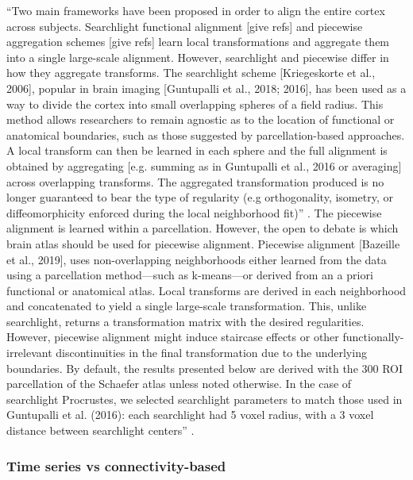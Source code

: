``Two main frameworks have been proposed in order to align the entire cortex
across subjects.
%
Searchlight functional alignment [give refs] and piecewise aggregation schemes
[give refs] learn local transformations and aggregate them into a single
large-scale alignment.
%
However, searchlight and piecewise differ in how they aggregate transforms.
%
The searchlight scheme [Kriegeskorte et al., 2006], popular in brain imaging
[Guntupalli et al., 2018; 2016], has been used as a way to divide the cortex
into small overlapping spheres of a field radius.
%
This method allows researchers to remain agnostic as to the location of
functional or anatomical boundaries, such as those suggested by
parcellation-based approaches.
%
A local transform can then be learned in each sphere and the full alignment is
obtained by aggregating [e.g. summing as in Guntupalli et al., 2016 or
averaging] across overlapping transforms.
%
The aggregated transformation produced is no longer guaranteed to bear the type
of regularity (e.g orthogonality, isometry, or diffeomorphicity enforced during
the local neighborhood fit)'' \citep{bazeille2021empirical}.
%
The piecewise alignment is learned within a parcellation.
%
However, the open to debate is which brain atlas should be used for piecewise
alignment.
%
Piecewise alignment [Bazeille et al., 2019], uses non-overlapping
neighborhoods either learned from the data using a parcellation method—such as
k-means—or derived from an a priori functional or anatomical atlas.
%
Local transforms are derived in each neighborhood and concatenated to yield a
single large-scale transformation.
%
This, unlike searchlight, returns a transformation matrix with the desired
regularities.
%
However, piecewise alignment might induce staircase effects or other
functionally-irrelevant discontinuities in the final transformation due to the
underlying boundaries.
%
By default, the results presented below are derived with the 300 ROI
parcellation of the Schaefer atlas unless noted otherwise.
%
In the case of searchlight Procrustes, we selected searchlight parameters to
match those used in Guntupalli et al. (2016):
%
each searchlight had 5 voxel radius, with a 3 voxel distance between searchlight
centers'' \citep{bazeille2021empirical}.


\subsubsection{Time series vs connectivity-based}


